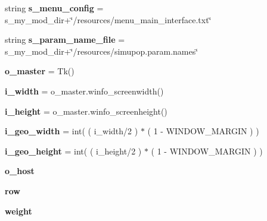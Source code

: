 \begin{DoxyCompactItemize}
\item 
string {\bfseries s\+\_\+menu\+\_\+config} = s\+\_\+my\+\_\+mod\+\_\+dir+\char`\"{}/resources/menu\+\_\+main\+\_\+interface.\+txt\char`\"{}\hypertarget{namespacenegui_1_1negui_a633625b34a8aedc24e0f289b5aaeef80}{}\label{namespacenegui_1_1negui_a633625b34a8aedc24e0f289b5aaeef80}

\item 
string {\bfseries s\+\_\+param\+\_\+name\+\_\+file} = s\+\_\+my\+\_\+mod\+\_\+dir+\char`\"{}/resources/simupop.\+param.\+names\char`\"{}\hypertarget{namespacenegui_1_1negui_a41ff694cb0b09aa2ce195c71a5756edf}{}\label{namespacenegui_1_1negui_a41ff694cb0b09aa2ce195c71a5756edf}

\item 
{\bfseries o\+\_\+master} = Tk()\hypertarget{namespacenegui_1_1negui_a2c4f72271479ddc1a76da3f12a7b8ae9}{}\label{namespacenegui_1_1negui_a2c4f72271479ddc1a76da3f12a7b8ae9}

\item 
{\bfseries i\+\_\+width} = o\+\_\+master.\+winfo\+\_\+screenwidth()\hypertarget{namespacenegui_1_1negui_a6139fe01ac7f460563e2bf187daf3581}{}\label{namespacenegui_1_1negui_a6139fe01ac7f460563e2bf187daf3581}

\item 
{\bfseries i\+\_\+height} = o\+\_\+master.\+winfo\+\_\+screenheight()\hypertarget{namespacenegui_1_1negui_a100009f5c5614a0af046d1fa5198292c}{}\label{namespacenegui_1_1negui_a100009f5c5614a0af046d1fa5198292c}

\item 
{\bfseries i\+\_\+geo\+\_\+width} = int( ( i\+\_\+width/2 ) $\ast$ ( 1 -\/ W\+I\+N\+D\+O\+W\+\_\+\+M\+A\+R\+G\+IN ) )\hypertarget{namespacenegui_1_1negui_a58c17801bb71fab5e1065a571592b80c}{}\label{namespacenegui_1_1negui_a58c17801bb71fab5e1065a571592b80c}

\item 
{\bfseries i\+\_\+geo\+\_\+height} = int( ( i\+\_\+height/2 ) $\ast$ ( 1 -\/ W\+I\+N\+D\+O\+W\+\_\+\+M\+A\+R\+G\+IN ) )\hypertarget{namespacenegui_1_1negui_a3112d1686c284df2d10c0f77c5dc5cbe}{}\label{namespacenegui_1_1negui_a3112d1686c284df2d10c0f77c5dc5cbe}

\item 
{\bfseries o\+\_\+host}
\item 
{\bfseries row}\hypertarget{namespacenegui_1_1negui_a1891ae87fc34f0a97c0a376c1fd7ab36}{}\label{namespacenegui_1_1negui_a1891ae87fc34f0a97c0a376c1fd7ab36}

\item 
{\bfseries weight}\hypertarget{namespacenegui_1_1negui_aebca42043260f0b71ddc51fafff5b74d}{}\label{namespacenegui_1_1negui_aebca42043260f0b71ddc51fafff5b74d}


\end{DoxyCompactItemize}
